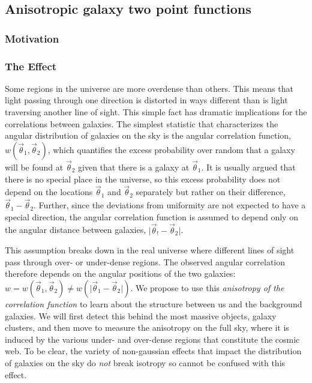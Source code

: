 \subsection{Anisotropic galaxy two point functions}\label{sec:lia}

\subsubsection{Motivation}

\subsubsection{The Effect}
Some regions in the universe are more overdense than
others.  This means that light passing through one direction is
distorted in ways different than is light traversing another line of
sight. This simple fact has dramatic implications for the
correlations between galaxies. The simplest statistic that
characterizes the angular distribution of galaxies on the sky is the
angular correlation function, $w(\vec\theta_1,\vec\theta_2)$, which
quantifies the excess probability over random that a galaxy will be
found at $\vec\theta_2$ given that there is a galaxy at
$\vec\theta_1$. It is usually argued that there is no special place in
the universe, so this excess probability does not depend on the
locations $\vec\theta_1$ and $\vec\theta_2$ separately but rather on
their difference, $\vec\theta_1-\vec\theta_2$. Further, since the
deviations from uniformity are not expected to have a special
direction, the angular correlation function is assumed to depend only
on the angular distance between galaxies, $\vert\vec\theta_!-\vec\theta_2\vert$.

This assumption breaks down in the real universe where different lines
of sight pass through over- or under-dense regions. The observed
angular correlation therefore depends on the angular positions of the
two galaxies: $w=w(\vec\theta_1 ,\vec\theta_2)\ne
w(\vert\vec\theta_1-\vec\theta_2\vert)$. We propose to use this {\it
  anisotropy of the correlation function} to learn about the structure
between us and the background galaxies. We will first detect this
behind the most massive objects, galaxy clusters, and then move to
measure the anisotropy on the full sky, where it is induced by the
various under- and over-dense regions that constitute the cosmic
web. To be clear, the variety of non-gaussian effects that impact the
distribution of galaxies on the sky do {\it not} break isotropy so
cannot be confused with this effect.

